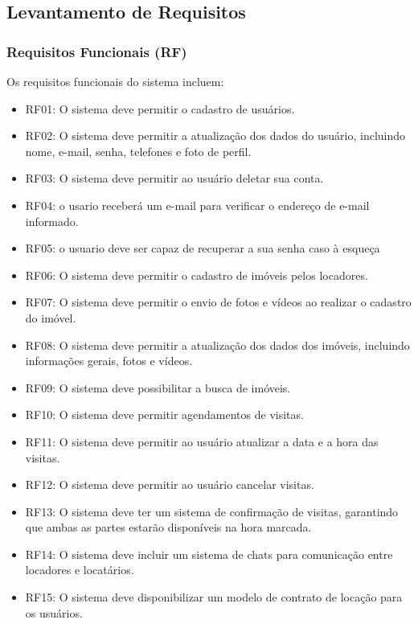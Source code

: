 \subsection{Levantamento de Requisitos}

\subsubsection{Requisitos Funcionais (RF)}
Os requisitos funcionais do sistema incluem:



\begin{itemize}
    \item RF01: O sistema deve permitir o cadastro de usuários.
    \item RF02: O sistema deve permitir a atualização dos dados do usuário, incluindo nome, e-mail, senha, telefones e foto de perfil.
    \item RF03: O sistema deve permitir ao usuário deletar sua conta.
    \item RF04: o usario receberá um e-mail para verificar o endereço de e-mail informado.
    \item RF05: o usuario deve ser capaz de recuperar a sua senha caso à esqueça
    \item RF06: O sistema deve permitir o cadastro de imóveis pelos locadores.
    \item RF07: O sistema deve permitir o envio de fotos e vídeos ao realizar o cadastro do imóvel.
    \item RF08: O sistema deve permitir a atualização dos dados dos imóveis, incluindo informações gerais, fotos e vídeos.
    \item RF09: O sistema deve possibilitar a busca de imóveis.
    \item RF10: O sistema deve permitir agendamentos de visitas.
    \item RF11: O sistema deve permitir ao usuário atualizar a data e a hora das visitas.
    \item RF12: O sistema deve permitir ao usuário cancelar visitas.
    \item RF13: O sistema deve ter um sistema de confirmação de visitas, garantindo que ambas as partes estarão disponíveis na hora marcada.
    \item RF14: O sistema deve incluir um sistema de chats para comunicação entre locadores e locatários.
    \item RF15: O sistema deve disponibilizar um modelo de contrato de locação para os usuários.
\end{itemize}



